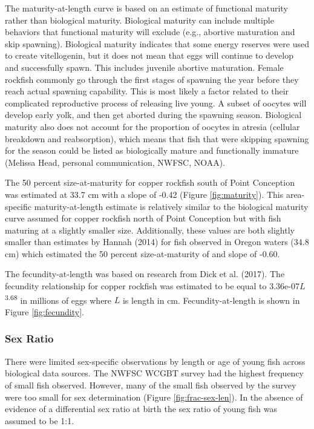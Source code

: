 \documentclass[11pt,
  english,
  letterpaper,
]{article}
\begin{document}
The maturity-at-length curve is based on an estimate of functional maturity rather than biological maturity. Biological maturity can include multiple behaviors that functional maturity will exclude (e.g., abortive maturation and skip spawning). Biological maturity indicates that some energy reserves were used to create vitellogenin, but it does not mean that eggs will continue to develop and successfully spawn. This includes juvenile abortive maturation. Female rockfish commonly go through the first stages of spawning the year before they reach actual spawning capability. This is most likely a factor related to their complicated reproductive process of releasing live young. A subset of oocytes will develop early yolk, and then get aborted during the spawning season. Biological maturity also does not account for the proportion of oocytes in atresia (cellular breakdown and reabsorption), which means that fish that were skipping spawning for the season could be listed as biologically mature and functionally immature (Melissa Head, personal communication, NWFSC, NOAA).

The 50 percent size-at-maturity for copper rockfish south of Point Conception was estimated at 33.7 cm with a slope of -0.42 (Figure \ref{fig:maturity}). This area-specific maturity-at-length estimate is relatively similar to the biological maturity curve assumed for copper rockfish north of Point Conception but with fish maturing at a slightly smaller size. Additionally, these values are both slightly smaller than estimates by Hannah (2014) for fish observed in Oregon waters (34.8 cm) which estimated the 50 percent size-at-maturity of and slope of -0.60.

The fecundity-at-length was based on research from Dick et al. (2017). The fecundity relationship for copper rockfish was estimated to be equal to 3.36e-07\(L\)\textsuperscript{3.68} in millions of eggs where \(L\) is length in cm. Fecundity-at-length is shown in Figure \ref{fig:fecundity}.

\hypertarget{sex-ratio}{%
\subsubsection{Sex Ratio}\label{sex-ratio}}

There were limited sex-specific observations by length or age of young fish across biological data sources. The NWFSC WCGBT survey had the highest frequency of small fish observed. However, many of the small fish observed by the survey were too small for sex determination (Figure \ref{fig:frac-sex-len}). In the absence of evidence of a differential sex ratio at birth the sex ratio of young fish was assumed to be 1:1.
\end{document}
